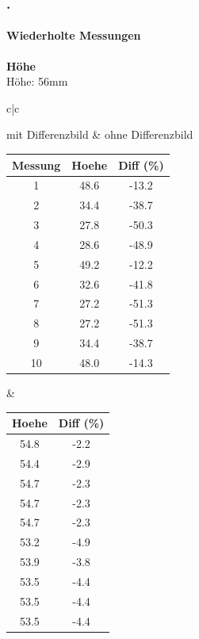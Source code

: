 \documentclass[xcolor=dvipsnames]{beamer}
\def\frametitlesec{\frametitle{\arabic{section}.\hspace{0.5ex}\insertsection}}
\def\framesubtitles#1{\framesubtitle{\hspace{3.5ex}#1}}
\begin{document}
\begin{frame}
	\frametitlesec
	\framesubtitles{Wiederholte Messungen}
		\textbf{Höhe}\\
		
		Höhe: 56mm
		
		\begin{tabular}{c|c}
		
		mit Differenzbild & ohne Differenzbild\\
		
		\begin{tabular}{c|c|c}
			Messung & Hoehe & Diff (\%) \\ \hline
1 & 48.6 & -13.2 \\
2 & 34.4 & -38.7 \\
3 & 27.8 & -50.3 \\
4 & 28.6 & -48.9 \\
5 & 49.2 & -12.2 \\
6 & 32.6 & -41.8 \\
7 & 27.2 & -51.3 \\
8 & 27.2 & -51.3 \\
9 & 34.4 & -38.7 \\
10 & 48.0 & -14.3\\

		\end{tabular} &
		
		
		\begin{tabular}{c|c}
			Hoehe & Diff (\%) \\ \hline
 54.8 &  -2.2 \\
 54.4 &  -2.9 \\
 54.7 &  -2.3 \\
 54.7 &  -2.3 \\
 54.7 &  -2.3 \\
 53.2 &  -4.9 \\
 53.9 &  -3.8 \\
 53.5 &  -4.4 \\
 53.5 &  -4.4 \\
 53.5 & -4.4 \\


		\end{tabular}
		
		\end{tabular}
\end{frame}
\end{document}
